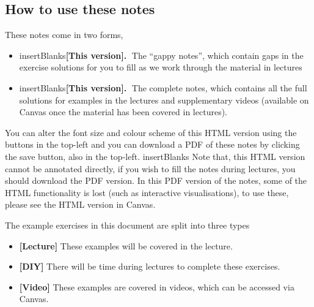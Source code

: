 \begin{ILOs}
    \item \ILOa
    \item \ILOb
    \item \ILOc
    \item \ILOd
    \item \ILOe
    \item \ILOf
    \item \ILOg
\end{ILOs}

\subsection{How to use these notes}

These notes come in two forms, 
\begin{itemize}
    \item \ifcsname insertBlanks\endcsname\textbf{[This version].}$\;$\fi
    The ``gappy notes'', which contain gaps in the exercise solutions for you to fill as we work through the material in lectures
    \item \ifcsname insertBlanks\endcsname\else\textbf{[This version].}$\;$\fi
    The complete notes, which contains all the full solutions for examples in the lectures and supplementary videos (available on Canvas once the material has been covered in lectures).
\end{itemize}

\iflatexml
    You can alter the font size and colour scheme of this HTML version using the buttons in the top-left and you can download a PDF of these notes by clicking the save button, also in the top-left. 
    \ifcsname insertBlanks\endcsname
        Note that, this HTML version cannot be annotated directly, if you wish to fill the notes during lectures, you should download the PDF version.
    \fi
\else
    In this PDF version of the notes, some of the HTML functionality is lost (such as interactive visualisations), to use these, please see the HTML version in Canvas. 
\fi

The example exercises in this document are split into three types
\begin{itemize}
    \item \textbf{[Lecture]} These examples will be covered in the lecture.
    \item \textbf{[DIY]} There will be time during lectures to complete these exercises.
    \item \textbf{[Video]} These examples are covered in videos, which can be accessed via Canvas.
\end{itemize}

